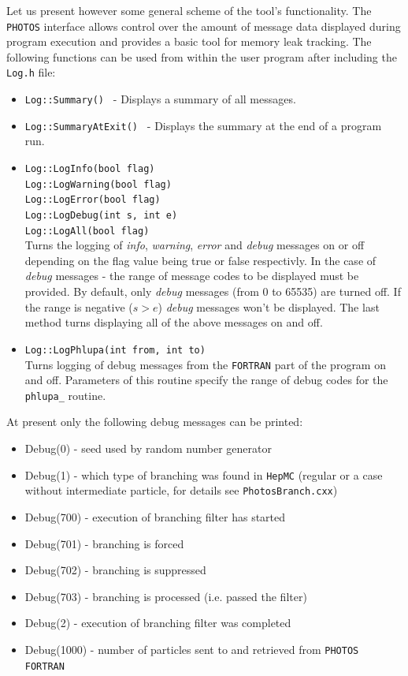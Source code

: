 \documentclass[]{Photos_interface_design}
\begin{document}
Let us present however some general scheme of the tool's
functionality.  The {\tt PHOTOS} interface allows control over the
amount of message data displayed during program execution and
provides a basic tool for memory leak tracking. The following
functions can be used from within the user program after including the
{\tt Log.h} file:
\begin{itemize}
  \item {\tt Log::Summary() } - Displays a summary of all messages.
  \item {\tt Log::SummaryAtExit() } - Displays the summary at the end of a program run.
  \item {\tt Log::LogInfo(bool flag) } \\
        {\tt Log::LogWarning(bool flag) } \\
        {\tt Log::LogError(bool flag) } \\
        {\tt Log::LogDebug(int s, int e) } \\
        {\tt Log::LogAll(bool flag)} \\
        Turns the logging of \textit{info}, \textit{warning}, \textit{error} and \textit{debug} messages on or off depending
        on the flag value being true or false respectivly. In the case of \textit{debug} messages - the range of message codes
        to be displayed must be provided. By default, only \textit{debug} messages
        (from 0 to 65535) are turned off. If the range is negative ($s>e$) \textit{debug} messages
        won't be displayed. The last method turns displaying all of the above messages on and off.
  \item {\tt Log::LogPhlupa(int from, int to) } \\
        Turns logging of debug messages from the {\tt FORTRAN} part of the program on and off.
        Parameters of this routine specify the range of debug codes for the {\tt phlupa\_} routine.
\end{itemize}

At present only the following debug messages can be printed:
\begin{itemize}
  \item Debug(0)    - seed used by random number generator
  \item Debug(1)    - which type of branching was found in {\tt HepMC}
                     (regular or a case without intermediate particle, for details see {\tt PhotosBranch.cxx})
  \item Debug(700)  - execution of branching filter has started
  \item Debug(701)  - branching is forced
  \item Debug(702)  - branching is suppressed
  \item Debug(703)  - branching is processed (i.e. passed the filter)
  \item Debug(2)    - execution of branching filter was completed
  \item Debug(1000) - number of particles sent to and retrieved from {\tt PHOTOS FORTRAN}
\end{itemize}
 
\end{document}
